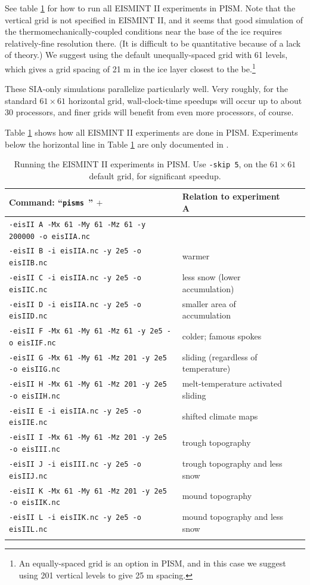 \documentclass[11pt,final]{amsart}
\renewcommand{\t}[1]{\texttt{#1}}
\begin{document}
See table \ref{tab:eisII} for how to run all EISMINT II experiments in PISM.  Note that the vertical grid is not specified in EISMINT II, and it seems that good simulation of the thermomechanically-coupled conditions near the base of the ice requires relatively-fine resolution there.  (It is difficult to be quantitative because of a lack of theory.)  We suggest using the default unequally-spaced grid with 61 levels, which gives a grid spacing of 21 m in the ice layer closest to the be.\footnote{An equally-spaced grid is an option in PISM, and in this case we suggest using 201 vertical levels to give 25 m spacing.}

These SIA-only simulations parallelize particularly well.  Very roughly, for the standard $61\times 61$ horizontal grid, wall-clock-time speedups will occur up to about 30 processors, and finer grids will benefit from even more processors, of course.

Table \ref{tab:eisII} shows how all EISMINT II experiments are done in PISM.  Experiments below the horizontal line in Table \ref{tab:eisII} are only documented in \cite{EISIIdescribe}.

\begin{table}[ht]
\caption{Running the EISMINT II experiments in PISM.  Use \t{-skip 5}, on the $61\times 61$ default grid, for significant speedup.}\label{tab:eisII}
\small
\begin{tabular}{@{}llll}\hline
\textbf{Command: ``\t{pisms }'' $+$} & \textbf{Relation to experiment A} \\ \hline
\verb|-eisII A -Mx 61 -My 61 -Mz 61 -y 200000 -o eisIIA.nc| & \\
\verb|-eisII B -i eisIIA.nc -y 2e5 -o eisIIB.nc| & warmer \\
\verb|-eisII C -i eisIIA.nc -y 2e5 -o eisIIC.nc| & less snow (lower accumulation)\\
\verb|-eisII D -i eisIIA.nc -y 2e5 -o eisIID.nc| & smaller area of accumulation \\
\verb|-eisII F -Mx 61 -My 61 -Mz 61 -y 2e5 -o eisIIF.nc| & colder; famous spokes \cite{BBL} \\
\verb|-eisII G -Mx 61 -My 61 -Mz 201 -y 2e5 -o eisIIG.nc| & sliding (regardless of temperature) \\
\verb|-eisII H -Mx 61 -My 61 -Mz 201 -y 2e5 -o eisIIH.nc| & melt-temperature activated sliding \\ \hline
\verb|-eisII E -i eisIIA.nc -y 2e5 -o eisIIE.nc| & shifted climate maps \\
\verb|-eisII I -Mx 61 -My 61 -Mz 201 -y 2e5 -o eisIII.nc| & trough topography \\
\verb|-eisII J -i eisIII.nc -y 2e5 -o eisIIJ.nc| & trough topography and less snow \\
\verb|-eisII K -Mx 61 -My 61 -Mz 201 -y 2e5 -o eisIIK.nc| & mound topography \\
\verb|-eisII L -i eisIIK.nc -y 2e5 -o eisIIL.nc| & mound topography and less snow \\
\hline\normalsize
\end{tabular}\end{table}
\end{document}
